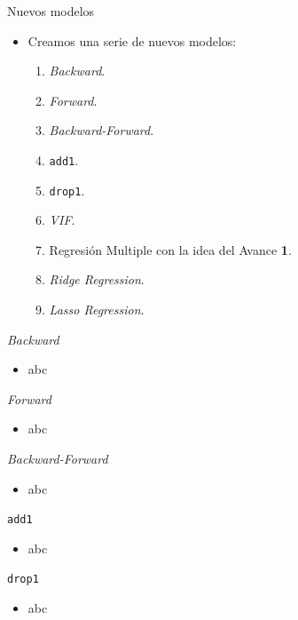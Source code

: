 \documentclass[11pt]{beamer}
\newcommand{\cod}[1]{\texttt{\frenchspacing#1}}
\begin{document}
\begin{frame}{Nuevos modelos}
	\begin{itemize}
		\item Creamos una serie de nuevos modelos:
		\begin{enumerate}
			\item \textit{Backward}.
			\pause
			\item \textit{Forward}.
			\pause
			\item \textit{Backward-Forward}.
			\pause
			\item \cod{add1}.
			\pause
			\item \cod{drop1}.
			\pause
			\item \textit{VIF}.
			\pause
			\item Regresión Multiple con la idea del Avance \textbf{1}.
			\pause
			\item \textit{Ridge Regression}.
			\pause
			\item \textit{Lasso Regression}.
		\end{enumerate}
	\end{itemize}
\end{frame}

\begin{frame}{\textit{Backward}}
	\begin{itemize}
		\item abc
	\end{itemize}
\end{frame}

\begin{frame}{\textit{Forward}}
	\begin{itemize}
		\item abc
	\end{itemize}
\end{frame}

\begin{frame}{\textit{Backward-Forward}}
	\begin{itemize}
		\item abc
	\end{itemize}
\end{frame}

\begin{frame}{\cod{add1}}
	\begin{itemize}
		\item abc
	\end{itemize}
\end{frame}

\begin{frame}{\cod{drop1}}
	\begin{itemize}
		\item abc
	\end{itemize}
\end{frame}
\end{document}

